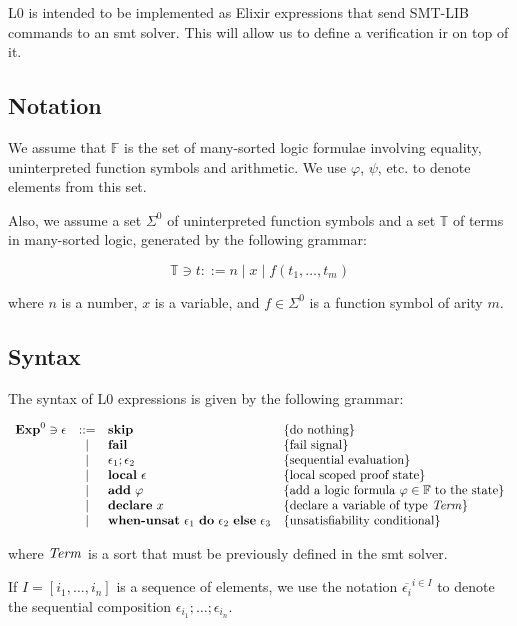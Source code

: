 L0 is intended to be implemented as Elixir expressions that send SMT-LIB 
commands to an \acrshort{smt} solver. This will allow us to define a
verification \gls{ir} on top of it.

\subsection{Notation}

We assume that $\mathbb{F}$ is the set of many-sorted logic formulae involving
equality, uninterpreted function symbols and arithmetic. We use $\varphi$, 
$\psi$, etc. to denote elements from this set.

Also, we assume a set $\Sigma^{0}$ of uninterpreted function symbols and a set
$\mathbb{T}$ of terms in many-sorted logic, generated by the following grammar:

\[
\mathbb{T} \ni t ::= n \mid x \mid f(t_1, \ldots, t_m)
\]

where $n$ is a number, $x$ is a variable, and $f \in \Sigma^{0}$ is a function 
symbol of arity $m$.

\subsection{Syntax}

The syntax of L0 expressions is given by the following grammar:

\[
\begin{array}{rcll}
\mathbf{Exp}^{0} \ni \epsilon & ::= & \textbf{skip} & \{ \textrm{do nothing} \}\\
& | & \textbf{fail} & \{ \textrm{fail signal} \}\\
& | & \epsilon_1;\epsilon_2 & \{ \textrm{sequential evaluation} \}\\
& | & \textbf{local}~\epsilon & \{ \textrm{local scoped proof state} \}\\
& | & \textbf{add}~\varphi &  \{ \textrm{add a logic formula $\varphi \in \mathbb{F}$ to the state} \}\\
& | & \textbf{declare}~x &  \{ \textrm{declare a variable of type $\mathit{Term}$} \}\\
& | & \textbf{when-unsat}~\epsilon_1~\textbf{do}~\epsilon_2~\textbf{else}~\epsilon_3 &  \{ \textrm{unsatisfiability conditional} \}\\
\end{array}
\]

where $\mathit{Term}$ is a sort that must be previously defined in the \acrshort{smt}
solver.

If $I = [i_1, \ldots, i_n]$ is a sequence of elements, we use the notation
$\overline{\epsilon_i}^{i \in I}$ to denote the sequential composition 
$\epsilon_{i_1};\dots;\epsilon_{i_n}$.

